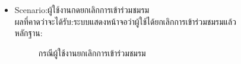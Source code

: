 \documentclass[14pt,oneside,openright,a4paper]{cpe-thai-project}
\begin{document}
\begin{itemize}
  \item Scenario:ผู้ใช้งานกดยกเลิกการเข้าร่วมชมรม
  \\ผลที่คาดว่าจะได้รับ:ระบบแสดงหน้าจอว่าผู้ใช้ได้ยกเลิกการเข้าร่วมชมรมแล้ว
  \\หลักฐาน:\\
  \begin{figure}[!h]\centering
    \setlength{\fboxrule}{0.5mm} %
    \setlength{\fboxsep}{0.5cm}
    \caption{กรณีผู้ใช้งานยกเลิกการเข้าร่วมชมรม}\label{fig:FeedPageClubTest}
  \end{figure}
\end{itemize}

\newpage
\end{document}
